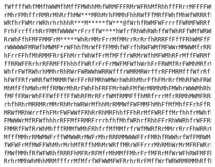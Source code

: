 \documentclass[12pt, article]{scrartcl}
\begin{document}
\begin{figure}[p]
\begin{verbatim}
fWffffWhfMMfhWWMfhMffFMWhhMhfWRMFFFRMrWFRhMfRhhffFRrrMFFFFWW
rMhrFMhffrRMRrMhRrfhMW***MRhMrhFMMhFhhRWfFfMRfFWhfMhWfWRRRfF
WRfhrFWMrrWRhrhrhhhR***M*****fW***@fWrhfRWMFWFrrrfFWRMFWRRfr
FrhFrrffrhRrFMMfWWWW*rFrrffW****hWfrfRhWhRWhffWfWhRFfWMfWRWR
RrWhFfhFMFFMMFrM*****WhRrMMrFrrMfMMrrRrRrfhRRRFfFffFRhWMFfFf
rWWWWWFMRWfhMWMF*rWFhhfMrWfFfFMMhfWFrfhRWFWMfMFWWrMMWWMfrRRh
hFrrFFhfMhRMMFRr$FhMrrfWhWfFrMfMFffrWRMrWfhMFWMhRFrMffFWRMff
ffRRWFFRrhrRFRMFfFhhhfFWRfrFrFrMWFMFWfhWrhFrFRWMfRrFWMhMRfrW
WhfrFWfRWhrhMMhrRhRWrFWRWWhWRRWfffrWMRMRWrffrRFFMRMfffWfrRfr
hFWfFRfrWRRfWfMRMRfWrFFrRFMRhWMWrhWhRhMhrFfhFMrRrfMhRFWhFRWh
MhMfFfhMWhrMffRMWrMhRrFWhFhFRFFMrhWhFMfWrMRMhMhFMWhrWWWMhRhF
fMFfFRWrWhFFFWfFffFfWhRFMrRFrfWMfRMMFffhMRfrrrMfrRRMhMWMFRRF
rhfhRhrMRRMRrMMrRhMrhWRWrMfhhMrRMMWfFWFMMFhMhFfMfMhfFFrhFfRr
MRWfMRhWrrfFhFMrFWFWWfFRhRrRhMRFhhfFFhRrMfFWRFffMrfhhfrMWhfF
FMWWWrMfRFWfhhhrRFFMfFRMRFrrrhfhfMhfWRhrfRhhFFrRhWWRhfrWFFRF
FMMRfFWfRrWhMhfffRMMfWMhFRhfrfMfMMfrfrWfMWRfRrMMrrRrrFhWRRrM
MfffMMhrRMWMWFrffWMWWRrMWFrMhrRRRMMWWWFFrFMRhfRWWhrfWfFMRWMr
fWFWFrMfMWFFWhMhrMrhMfRffhMhMrWRffMRrWFFrrrMhRMhWrMrMFRFWRrF
fMWfMMhfRfWFWRhfRRRFhMFRrRFMfrMhMMfFMhrFrfMFRrMfWrWFhRWFMFFM
RrhrMMhWhMhhMRMfffrrMfMfrfWFWWMFWFRrhrRrFMffWrfWRWRMRMMhRffM
\end{verbatim}
\end{figure}


\end{document}
